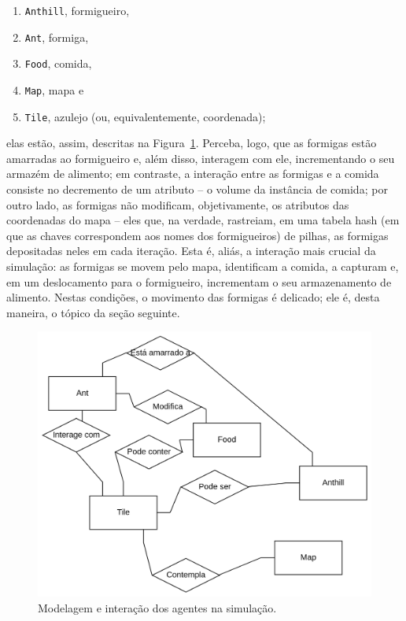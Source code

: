 \documentclass[12pt]{article}
\theoremstyle{definition}
\begin{document}
\begin{enumerate} 
	\item \texttt{Anthill}, formigueiro, 
	\item \texttt{Ant}, formiga, 
	\item \texttt{Food}, comida, 
	\item \texttt{Map}, mapa e 
	\item \texttt{Tile}, azulejo (ou, equivalentemente, coordenada); 
\end{enumerate} 

\noindent elas estão, assim, descritas na Figura~\ref{fig:siml}. Perceba, logo, que as formigas estão amarradas ao formigueiro e, além disso, interagem com ele, incrementando o seu armazém de alimento; em contraste, a interação entre as formigas e a comida consiste no decremento de um atributo -- o volume da instância de comida; por outro lado, as formigas não modificam, objetivamente, os atributos das coordenadas do mapa -- eles que, na verdade, rastreiam, em uma tabela hash (em que as chaves correspondem aos nomes dos formigueiros) de pilhas, as formigas depositadas neles em cada iteração. Esta é, aliás, a interação mais crucial da simulação: as formigas se movem pelo mapa, identificam a comida, a capturam e, em um deslocamento para o formigueiro, incrementam o seu armazenamento de alimento. Nestas condições, o movimento das formigas é delicado; ele é, desta maneira, o tópico da seção seguinte. 

\begin{figure} 
	\centering 
	\includegraphics[width = \textwidth]{image.png} 
	\caption{Modelagem e interação dos agentes na simulação.} 
	\label{fig:siml} 
\end{figure} 
\end{document}
